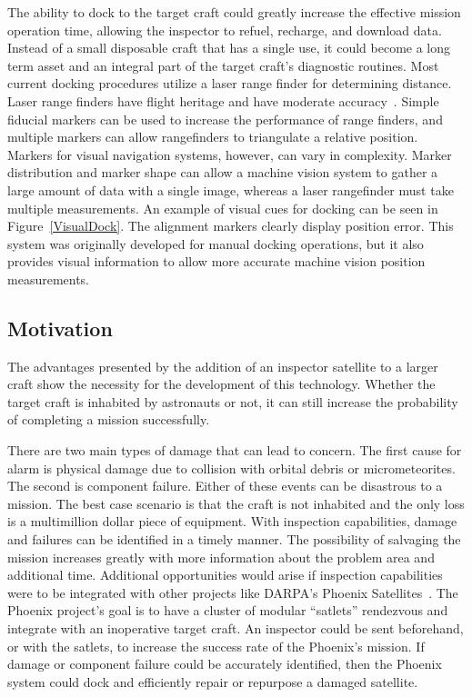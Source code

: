 \documentclass[journal, 10pt]{IEEEtran}
\begin{document}
The ability to dock to the target craft could greatly increase the effective mission operation time, allowing the inspector to refuel, recharge, and download data.  Instead of a small disposable craft that has a single use, it could become a long term asset and an integral part of the target craft's diagnostic routines.  Most current docking procedures utilize a laser range finder for determining distance.  Laser range finders have flight heritage and have moderate accuracy~\cite{Docking}.  Simple fiducial markers can be used to increase the performance of range finders, and multiple markers can allow rangefinders to triangulate a relative position.  Markers for visual navigation systems, however, can vary in complexity.  Marker distribution and marker shape can allow a machine vision system to gather a large amount of data with a single image, whereas a laser rangefinder must take multiple measurements.  An example of visual cues for docking can be seen in Figure~\ref{VisualDock}.  The alignment markers clearly display position error.  This system was originally developed for manual docking operations, but it also provides visual information to allow more accurate machine vision position measurements.



\subsection{Motivation}
The advantages presented by the addition of an inspector satellite to a larger craft show the necessity for the development of this technology.  Whether the target craft is inhabited by astronauts or not, it can still increase the probability of completing a mission successfully.

There are two main types of damage that can lead to concern.  The first cause for alarm is physical damage due to collision with orbital debris or micrometeorites.  The second is component failure.  Either of these events can be disastrous to a mission.  The best case scenario is that the craft is not inhabited and the only loss is a multimillion dollar piece of equipment.  With inspection capabilities, damage and failures can be identified in a timely manner.  The possibility of salvaging the mission increases greatly with more information about the problem area and additional time. Additional opportunities would arise if inspection capabilities were to be integrated with other projects like DARPA's Phoenix Satellites~\cite{Phoenix}.  The Phoenix project's goal is to have a cluster of modular ``satlets'' rendezvous and integrate with an inoperative target craft.  An inspector could be sent beforehand, or with the satlets, to increase the success rate of the Phoenix's mission.  If damage or component failure could be accurately identified, then the Phoenix system could dock and efficiently repair or repurpose a damaged satellite.
\end{document}
